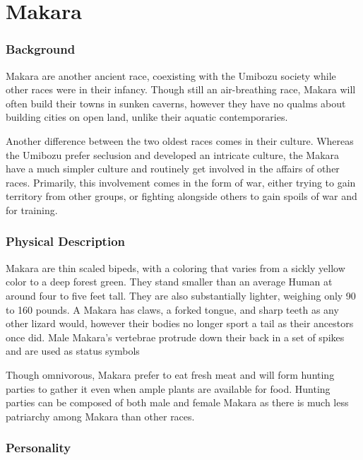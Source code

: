 \chapter*{Makara}

\subsection*{Background}

Makara are another ancient race, coexisting with the Umibozu society while other races were in their infancy. Though still an air-breathing race, Makara will often build their towns in sunken caverns, however they have no qualms about building cities on open land, unlike their aquatic contemporaries.

Another difference between the two oldest races comes in their culture. Whereas the Umibozu prefer seclusion and developed an intricate culture, the Makara have a much simpler culture and routinely get involved in the affairs of other races. Primarily, this involvement comes in the form of war, either trying to gain territory from other groups, or fighting alongside others to gain spoils of war and for training.

\subsection*{Physical Description}

Makara are thin scaled bipeds, with a coloring that varies from a sickly yellow color to a deep forest green. They stand smaller than an average Human at around four  to five feet tall. They are also substantially lighter, weighing only 90 to 160 pounds. A Makara has claws, a forked tongue, and sharp teeth as any other lizard would, however their bodies no longer sport a tail as their ancestors once did. Male Makara’s vertebrae protrude down their back in a set of spikes and are used as status symbols 

Though omnivorous, Makara prefer to eat fresh meat and will form hunting parties to gather it even when ample plants are available for food. Hunting parties can be composed of both male and female Makara as there is much less patriarchy among Makara than other races.

\subsection*{Personality}

